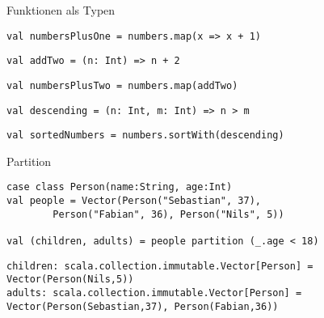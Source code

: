\documentclass[14pt,aspectratio=169,trans]{beamer} %
\begin{document}
\begin{frame}[fragile]{}
 \begin{block}{Funktionen als Typen}
\scriptsize
	\onslide<2->
  \begin{lstlisting}
val numbersPlusOne = numbers.map(x => x + 1)

	\end{lstlisting}
  \begin{lstlisting}[firstnumber = 2]
val addTwo = (n: Int) => n + 2
\end{lstlisting}
  \begin{lstlisting}[firstnumber = 3]
val numbersPlusTwo = numbers.map(addTwo)

\end{lstlisting}
  \begin{lstlisting}[firstnumber = 4]
val descending = (n: Int, m: Int) => n > m
\end{lstlisting}
  \begin{lstlisting}[firstnumber = 5]
val sortedNumbers = numbers.sortWith(descending)
\end{lstlisting}

\end{block}
\end{frame}

\begin{frame}[fragile]{}
	\begin{block}{Partition}
		\scriptsize
		\onslide<2->
  \begin{lstlisting}
case class Person(name:String, age:Int)
val people = Vector(Person("Sebastian", 37),  
		Person("Fabian", 36), Person("Nils", 5))

val (children, adults) = people partition (_.age < 18)
	\end{lstlisting}
  \begin{lstlisting}[firstnumber=5]
children: scala.collection.immutable.Vector[Person] = Vector(Person(Nils,5))
adults: scala.collection.immutable.Vector[Person] = Vector(Person(Sebastian,37), Person(Fabian,36))
	\end{lstlisting}

	\end{block}
\end{frame}
\end{document}
